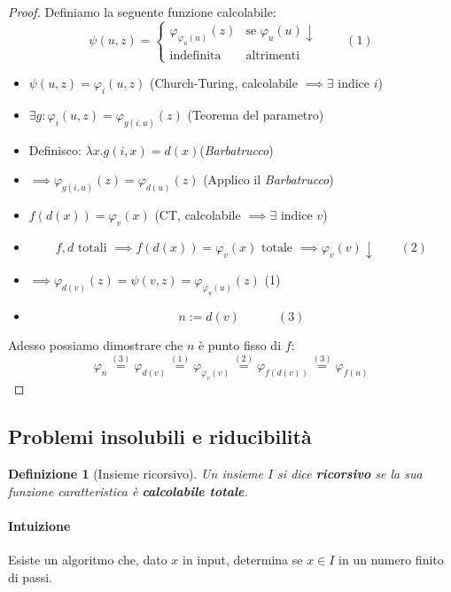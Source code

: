\documentclass[a4paper,10pt,oneside]{article}
\theoremstyle{break}
\newtheorem{deff}{Definizione}[section]
\begin{document}
\begin{mdframed}
\begin{proof}
Definiamo la seguente funzione calcolabile:
\[ \psi(u, z) = \begin{cases}
                                  \varphi_{\varphi_u(u)} (z) &\text{se } \varphi_u(u) \downarrow\\
                                  \text{indefinita} & \text{altrimenti}
                                 \end{cases}
 \quad\quad (1) \]
\begin{itemize}
 \item $\psi(u, z) = \varphi_i(u, z)$ \hfill (Church-Turing, calcolabile $\implies \exists$ indice $i$)
 \item $\exists g : \varphi_i (u, z) = \varphi_{g(i, u)}(z)$ \hfill  (Teorema del parametro)
 \item Definisco: $\lambda x . g(i, x) = d(x)$\hfill  (\emph{Barbatrucco})
 \item $\implies \varphi_{g(i, u)}(z) = \varphi_{d(u)}(z)$ \hfill (Applico il \emph{Barbatrucco})
 \item $f(d(x)) = \varphi_v(x)$ \hfill (CT, calcolabile $\implies \exists$ indice $v$)
 \item \[f,d \text{ totali }\implies f(d(x)) = \varphi_v(x)\text{ totale }\implies \varphi_v(v) \downarrow \quad\quad (2)\]
 \item $\implies \varphi_{d(v)}(z) = \psi(v, z) = \varphi_{\varphi_u(u)}(z)$ \hfill (1)
 \item \[ n := d(v) \quad\quad\quad (3)\]
\end{itemize}

Adesso possiamo dimostrare che $n$ è punto fisso di $f$:
\[ \varphi_n \overset{(3)}{=} \varphi_{d(v)} \overset{(1)}{=} \varphi_{\varphi_v(v)} \overset{(2)}{=} \varphi_{f(d(v))} \overset{(3)}{=} \varphi_{f(n)} \]

\end{proof}

\end{mdframed}
\bigskip
\subsection{Problemi insolubili e riducibilità}
\begin{deff}[Insieme ricorsivo]
 Un insieme $I$ si dice \textbf{ricorsivo} se la sua funzione caratteristica è \textbf{calcolabile totale}.
\end{deff}

\paragraph{Intuizione} Esiste un algoritmo che, dato $x$ in input, determina se $x \in I$ in un numero finito di passi.
\end{document}
